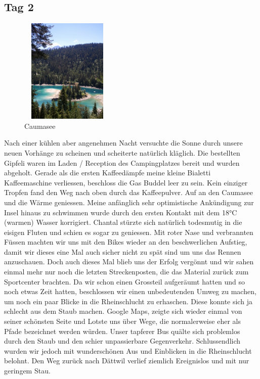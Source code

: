 \subsection{Tag 2}
\begin{figure} 
  \begin{centering}
    \includegraphics[width=0.4\textwidth, height=5cm, keepaspectratio]{../Bilder/Flims/21.jpg}
    \caption{Caumasee}
  \end{centering}
\end{figure} 

Nach einer kühlen aber angenehmen Nacht versuchte die Sonne durch unsere neuen Vorhänge zu scheinen und scheiterte natürlich kläglich.
Die bestellten Gipfeli waren im Laden / Reception des Campingplatzes bereit und wurden abgeholt.
Gerade als die ersten Kaffeedämpfe meine kleine Bialetti Kaffeemaschine verliessen, beschloss die Gas Buddel leer zu sein.
Kein einziger Tropfen fand den Weg nach oben durch das Kaffeepulver.
Auf an den Caumasee und die Wärme geniessen.
Meine anfänglich sehr optimistische Ankündigung zur Insel hinaus zu schwimmen wurde durch den ersten Kontakt mit dem 18°C (warmen) Wasser korrigiert.
Chantal stürzte sich natürlich todesmutig in die eisigen Fluten und schien es sogar zu geniessen.
Mit roter Nase und verbrannten Füssen machten wir uns mit den Bikes wieder an den beschwerlichen Aufstieg, damit wir dieses eine Mal auch sicher nicht zu spät sind um uns das Rennen anzuschauen.
Doch auch dieses Mal blieb uns der Erfolg vergönnt und wir sahen einmal mehr nur noch die letzten Streckenposten, die das Material zurück zum Sportcenter brachten.
Da wir schon einen Grossteil aufgeräumt hatten und so noch etwas Zeit hatten, beschlossen wir einen unbedeutenden Umweg zu machen, um noch ein paar Blicke in die Rheinschlucht zu erhaschen.
Diese konnte sich ja schlecht aus dem Staub machen.
Google Maps, zeigte sich wieder einmal von seiner schönsten Seite und Lotste uns über Wege, die normalerweise eher als Pfade bezeichnet werden würden.
Unser tapferer Bus quälte sich problemlos durch den Staub und den schier unpassierbare Gegenverkehr.
Schlussendlich wurden wir jedoch mit wunderschönen Aus und Einblicken in die Rheinschlucht belohnt.
Den Weg zurück nach Dättwil verlief ziemlich Ereignislos und mit nur geringem Stau.

